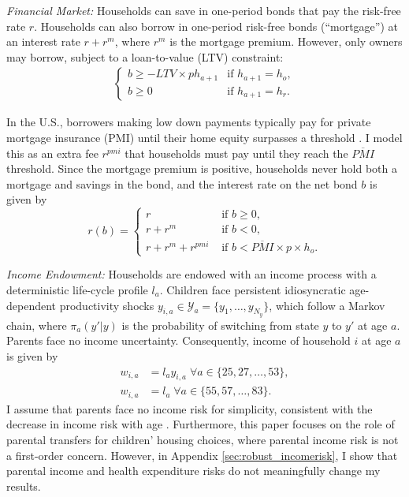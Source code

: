 \documentclass[12pt]{article}
\begin{document}
\textit{Financial Market:} Households can save in one-period bonds that pay the risk-free rate $r$. Households can also borrow in one-period risk-free bonds (``mortgage'') at an interest rate $r + r^m$, where $r^m$ is the mortgage premium. However, only owners may borrow, subject to a loan-to-value (LTV) constraint:
\begin{align*}
\begin{cases}
b\ge - LTV \times p h_{a+1} & \text{if } h_{a+1} = h_o, \\ 
b\ge 0 & \text{if } h_{a+1} = h_r.
\end{cases}
\end{align*}

In the U.S., borrowers making low down payments typically pay for private mortgage insurance (PMI) until their home equity surpasses a threshold \citep{goodman2017sixty}. I model this as an extra fee $r^{pmi}$ that households must pay until they reach the $\overline{PMI}$ threshold. Since the mortgage premium is positive, households never hold both a mortgage and savings in the bond, and the interest rate on the net bond $b$ is given by
\begin{equation}\label{eq:rb}
r(b) = \begin{cases}
r & \text{ if } b\ge0, \\
r +r^m & \text{ if } b<0, \\
r +r^m +r^{pmi}& \text{ if } b < \overline{PMI}\times p\times h_o.
\end{cases}
\end{equation}

\textit{Income Endowment:} Households are endowed with an income process with a deterministic life-cycle profile $l_a$. Children face persistent idiosyncratic age-dependent productivity shocks $y_{i,a}\in\mathcal{Y}_a=\{y_1,\dots,y_{N_y}\}$, which follow a Markov chain, where $\pi_a(y'|y)$ is the probability of switching from state $y$ to $y'$ at age $a$. Parents face no income uncertainty. Consequently, income of household $i$ at age $a$ is given by
\begin{align}
w_{i,a} &= l_ay_{i,a} \; \forall a\in\{25,27,\dots,53\}, \label{eq:wk} \\
w_{i,a} &= l_a \; \forall a\in\{55,57,\dots,83\}. \label{eq:wp}
\end{align}
I assume that parents face no income risk for simplicity, consistent with the decrease in income risk with age \citep{Sanchez2020}. Furthermore, this paper focuses on the role of parental transfers for children' housing choices, where parental income risk is not a first-order concern. However, in Appendix \ref{sec:robust_incomerisk}, I show that parental income and health expenditure risks do not meaningfully change my results.
\end{document}
